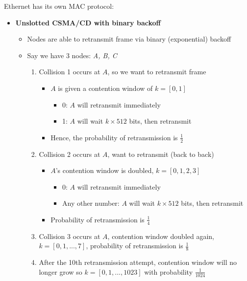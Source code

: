 \documentclass{article}
\begin{document}
Ethernet has its own MAC protocol:
\begin{itemize}
    \item \textbf{Unslotted CSMA/CD with binary backoff}
    \begin{itemize}
        \item Nodes are able to retransmit frame via binary (exponential) backoff
        \item Say we have 3 nodes: \textit{A, B, C}
        \begin{enumerate}
            \item Collision 1 occurs at $A$, so we want to retransmit frame
            \begin{itemize}
                \item $A$ is given a contention window of $k=[0,1]$
                \begin{itemize}
                    \item 0: $A$ will retransmit immediately
                    \item 1: $A$ will wait $k\times512$ bits, then retransmit
                \end{itemize}
                \item Hence, the probability of retransmission is $\frac{1}{2}$
            \end{itemize}
            \item Collision 2 occurs at $A$, want to retransmit (back to back)
            \begin{itemize}
                \item $A$'s contention window is doubled, $k=[0,1,2,3]$
                \begin{itemize}
                    \item 0: $A$ will retransmit immediately
                    \item Any other number: $A$ will wait $k\times512$ bits, then retransmit
                \end{itemize}
                \item Probability of retransmission is $\frac{1}{4}$
            \end{itemize}
            \item Collision 3 occurs at $A$, contention window doubled again, $k=[0,1,...,7]$, 
            probability of retransmission is $\frac{1}{8}$
            \item After the 10th retransmission attempt, contention window will no longer grow so
            $k=[0,1,...,1023]$ with probability $\frac{1}{1024}$
        \end{enumerate}
    \end{itemize}
\end{itemize}
\end{document}
